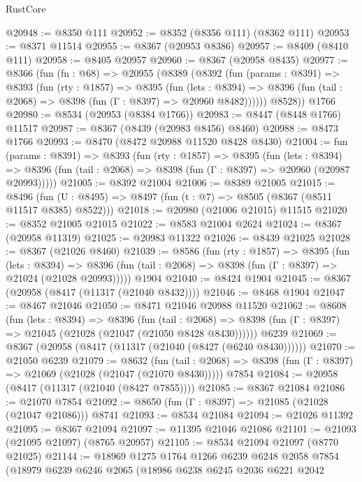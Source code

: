 \begin{lexlean}{RustCore}
\begin{coremodule}
@20948 := @8350 @111
@20952 := @8352 (@8356 @111) (@8362 @111)
@20953 := @8371 @11514
@20955 := @8367 (@20953 @8386)
@20957 := @8409 (@8410 @111)
@20958 := @8405 @20957
@20960 := @8367 (@20958 @8435)
@20977 := @8366
    (fun (fn : @68) =>
    @20955
      (@8389
        (@8392
          (fun (params : @8391) =>
          @8393
            (fun (rty : @1857) =>
            @8395
              (fun (lets : @8394) =>
              @8396 (fun (tail : @2068) => @8398 (fun (Γ : @8397) => @20960 @8482))))))
        @8528))
    @1766
@20980 := @8534 (@20953 (@8384 @1766))
@20983 := @8447 (@8448 @1766) @11517
@20987 := @8367 (@8439 (@20983 @8456) @8460)
@20988 := @8473 @1766
@20993 := @8470 (@8472 @20988 @11520 @8428 @8430)
@21004 := fun (params : @8391) =>
  @8393
    (fun (rty : @1857) =>
    @8395
      (fun (lets : @8394) =>
      @8396 (fun (tail : @2068) => @8398 (fun (Γ : @8397) => @20960 (@20987 @20993)))))
@21005 := @8392 @21004
@21006 := @8389 @21005
@21015 := @8496
    (fun (U : @8495) => @8497 (fun (t : @7) => @8505 (@8367 (@8511 @11517 @8385) @8522)))
@21018 := @20980 (@21006 @21015) @11515
@21020 := @8352 @21005 @21015
@21022 := @8583 @21004 @2624
@21024 := @8367 (@20958 @11319)
@21025 := @20983 @11322
@21026 := @8439 @21025
@21028 := @8367 (@21026 @8460)
@21039 := @8586
    (fun (rty : @1857) =>
    @8395
      (fun (lets : @8394) =>
      @8396 (fun (tail : @2068) => @8398 (fun (Γ : @8397) => @21024 (@21028 @20993)))))
    @1904
@21040 := @8424 @1904
@21045 := @8367 (@20958 (@8417 (@11317 (@21040 @8432))))
@21046 := @8468 @1904
@21047 := @8467 @21046
@21050 := @8471 @21046 @20988 @11520
@21062 := @8608
    (fun (lets : @8394) =>
    @8396
      (fun (tail : @2068) =>
      @8398 (fun (Γ : @8397) => @21045 (@21028 (@21047 (@21050 @8428 @8430))))))
    @6239
@21069 := @8367 (@20958 (@8417 (@11317 (@21040 (@8427 (@6240 @8430))))))
@21070 := @21050 @6239
@21079 := @8632
    (fun (tail : @2068) => @8398 (fun (Γ : @8397) => @21069 (@21028 (@21047 (@21070 @8430)))))
    @7854
@21084 := @20958 (@8417 (@11317 (@21040 (@8427 @7855))))
@21085 := @8367 @21084
@21086 := @21070 @7854
@21092 := @8650 (fun (Γ : @8397) => @21085 (@21028 (@21047 @21086))) @8741
@21093 := @8534 @21084
@21094 := @21026 @11392
@21095 := @8367 @21094
@21097 := @11395 @21046 @21086
@21101 := @21093 (@21095 @21097) (@8765 @20957)
@21105 := @8534 @21094 @21097 (@8770 @21025)
@21144 := @18969
    @1275
    @1764
    @1266
    @6239
    @6248
    @2058
    @7854
    (@18979
      @6239
      @6246
      @2065
      (@18986
        @6238
        @6245
        @2036
        @6221
        @2042

\end{coremodule}
\end{lexlean}
